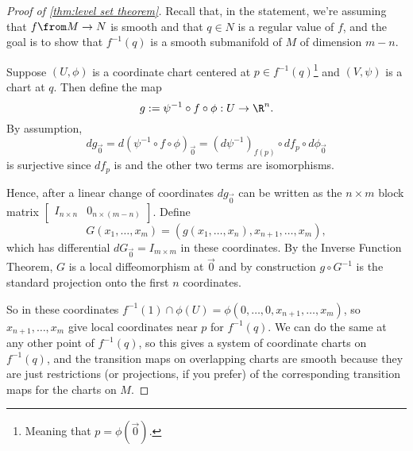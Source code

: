 \begin{proof}[Proof of \cref{thm:level set theorem}]
	Recall that, in the statement, we're assuming that $f\from M \to N$ is smooth and that $q \in N$ is a regular value of $f$, and the goal is to show that $f^{-1}(q)$ is a smooth submanifold of $M$ of dimension $m-n$.
	
	Suppose $(U,\phi)$ is a coordinate chart centered at $p \in f^{-1}(q)$\footnote{Meaning that $p = \phi(\vec{0})$.} and $(V, \psi)$ is a chart at $q$. Then define the map
	\[
		g := \psi^{-1} \circ f \circ \phi: U \to \R^n.
	\]
	By assumption,
	\[
		dg_{\vec{0}} = d(\psi^{-1} \circ f \circ \phi)_{\vec{0}} = (d \psi^{-1})_{f(p)} \circ df_p \circ d\phi_{\vec{0}}
	\]
	is surjective since $df_p$ is and the other two terms are isomorphisms.
	
	Hence, after a linear change of coordinates $dg_{\vec{0}}$ can be written as the $n \times m$ block matrix $\begin{bmatrix} I_{n \times n} & 0_{n \times (m-n)} \end{bmatrix}$. Define
	\[
		G(x_1, \dots , x_m) = (g(x_1, \dots , x_n), x_{n+1}, \dots , x_m),
	\]
	which has differential $dG_{\vec{0}} = I_{m \times m}$ in these coordinates. By the Inverse Function Theorem, $G$ is a local diffeomorphism at $\vec{0}$ and by construction $g \circ G^{-1}$ is the standard projection onto the first $n$ coordinates.
	
	So in these coordinates $f^{-1}(1) \cap \phi(U) = \phi(0, \dots , 0, x_{n+1}, \dots , x_m)$, so $x_{n+1} , \dots , x_m$ give local coordinates near $p$ for $f^{-1}(q)$. We can do the same at any other point of $f^{-1}(q)$, so this gives a system of coordinate charts on $f^{-1}(q)$, and the transition maps on overlapping charts are smooth because they are just restrictions (or projections, if you prefer) of the corresponding transition maps for the charts on $M$.
\end{proof}